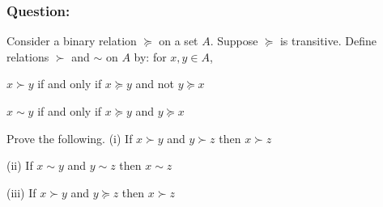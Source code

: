 \documentclass[12pt,a4paper]{article}
\begin{document}
  \subsubsection*{Question:} Consider a binary relation \(\succeq\) on a set \(A\). Suppose \(\succeq\) is transitive. Define relations \(\succ\) and \(\sim\) on \(A\) by: for \(x, y \in A\),

  \(x \succ y\) if and only if \(x \succeq y\) and not \(y \succeq x\)

  \(x \sim y\) if and only if \(x \succeq y\) and \(y \succeq x\)

Prove the following.
(i) If \(x \succ y\) and \(y \succ z\) then \(x \succ z\)

(ii) If \(x \sim y\) and \(y \sim z\) then \(x \sim z\)

(iii) If \(x \succ y\) and \(y \succeq z\) then \(x \succ z\)
\end{document}
